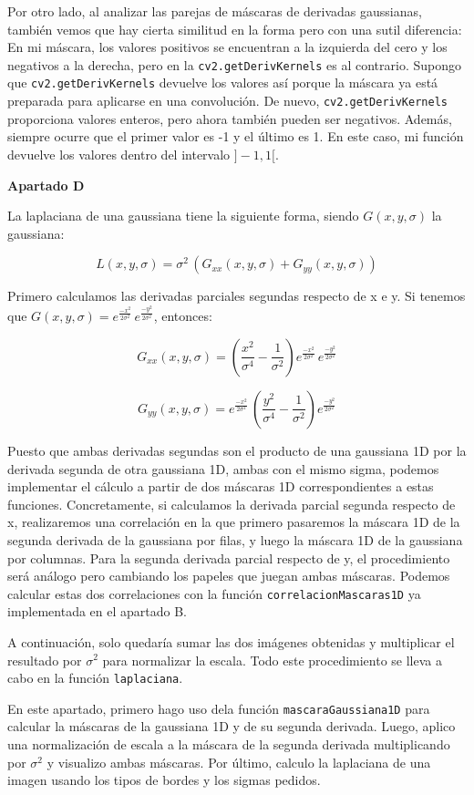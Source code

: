 \documentclass[10pt,a4paper]{article}
\begin{document}
\begin{list}{•}{}
Por otro lado, al analizar las parejas de máscaras de derivadas gaussianas, también vemos que hay cierta similitud en la forma pero con una sutil diferencia: En mi máscara, los valores positivos se encuentran a la izquierda del cero y los negativos a la derecha, pero en la \texttt{cv2.getDerivKernels} es al contrario. Supongo que \texttt{cv2.getDerivKernels} devuelve los valores así porque la máscara ya está preparada para aplicarse en una convolución. De nuevo, \texttt{cv2.getDerivKernels} proporciona valores enteros, pero ahora también pueden ser negativos. Además, siempre ocurre que el primer valor es -1 y el último es 1. En este caso, mi función devuelve los valores dentro del intervalo $]-1,1[$.

\hfill \break




\item \textbf{\large Apartado D}

La laplaciana de una gaussiana tiene la siguiente forma, siendo $G(x,y,\sigma)$ la gaussiana:

$$L(x,y,\sigma) = \sigma^{2} \, (G_{xx}(x,y,\sigma) + G_{yy}(x,y,\sigma))$$

Primero calculamos las derivadas parciales segundas respecto de x e y. Si tenemos que $G(x,y,\sigma) = e^{\frac{-x^2}{2\sigma^2}} \, e^{\frac{-y^2}{2\sigma^2}}$, entonces:

$$G_{xx}(x,y,\sigma) = \left( \frac{x^2}{\sigma^4} - \frac{1}{\sigma^2} \right) e^{\frac{-x^2}{2\sigma^2}} \, e^{\frac{-y^2}{2\sigma^2}}$$

$$G_{yy}(x,y,\sigma) = e^{\frac{-x^2}{2\sigma^2}} \, \left( \frac{y^2}{\sigma^4} - \frac{1}{\sigma^2} \right) e^{\frac{-y^2}{2\sigma^2}}$$

Puesto que ambas derivadas segundas son el producto de una gaussiana 1D por la derivada segunda de otra gaussiana 1D, ambas con el mismo sigma, podemos implementar el cálculo a partir de dos máscaras 1D correspondientes a estas funciones. Concretamente, si calculamos la derivada parcial segunda respecto de x, realizaremos una correlación en la que primero pasaremos la máscara 1D de la segunda derivada de la gaussiana por filas, y luego la máscara 1D de la gaussiana por columnas. Para la segunda derivada parcial respecto de y, el procedimiento será análogo pero cambiando los papeles que juegan ambas máscaras. Podemos calcular estas dos correlaciones con la función \texttt{correlacionMascaras1D} ya implementada en el apartado B.

A continuación, solo quedaría sumar las dos imágenes obtenidas y multiplicar el resultado por $\sigma^2$ para normalizar la escala. Todo este procedimiento se lleva a cabo en la función \texttt{laplaciana}.

En este apartado, primero hago uso dela función \texttt{mascaraGaussiana1D} para calcular la máscaras de la gaussiana 1D y de su segunda derivada. Luego, aplico una normalización de escala a la máscara de la segunda derivada multiplicando por $\sigma^2$ y visualizo ambas máscaras. Por último, calculo la laplaciana de una imagen usando los tipos de bordes y los sigmas pedidos.

\hfill \break

\end{list}
\end{document}
